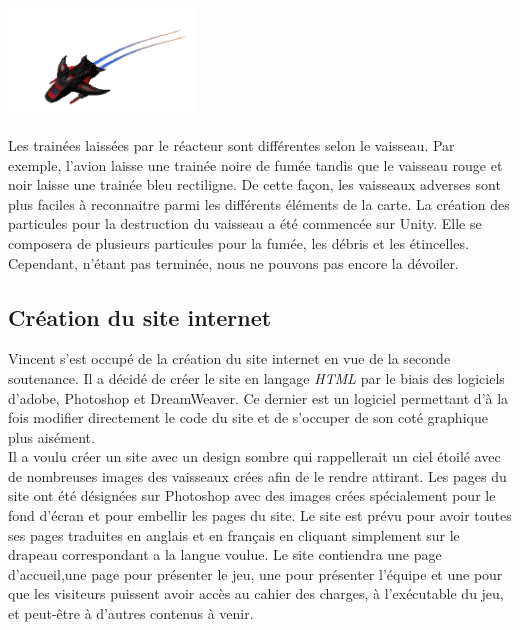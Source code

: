 \documentclass[10pt, titlepage]{report}
\begin{document}
\begin{center}
\includegraphics[height=3cm, width=5cm]{vaisseau_bouge.png}
\end{center}

Les trainées laissées par le réacteur sont différentes selon le vaisseau. Par exemple, l'avion laisse une trainée noire de fumée tandis que le vaisseau rouge et noir laisse une trainée bleu rectiligne. De cette façon, les vaisseaux adverses sont plus faciles à reconnaitre parmi les différents éléments de la carte. La création des particules pour la destruction du vaisseau a été commencée sur Unity. Elle se composera de plusieurs particules pour la fumée, les débris et les étincelles. Cependant, n’étant pas terminée, nous ne pouvons pas encore la dévoiler.  \\

\subsection{Création du site internet}
Vincent s'est occupé de la création du site internet en vue de la seconde soutenance. Il a décidé de créer le site en langage \textit{HTML} par le biais des logiciels d'adobe, Photoshop et DreamWeaver. Ce dernier est un logiciel permettant d'à la fois modifier directement le code du site et de s'occuper de son coté graphique plus aisément.\\

Il a voulu créer un site avec un design sombre qui rappellerait un ciel étoilé avec de nombreuses images des vaisseaux crées afin de le rendre attirant. Les pages du site ont été désignées sur Photoshop avec des images crées spécialement pour le fond d'écran et pour embellir les pages du site. Le site est prévu pour avoir toutes ses pages traduites en anglais et en français en cliquant simplement sur le drapeau correspondant a la langue voulue. Le site contiendra une page d'accueil,une page pour présenter le jeu, une pour présenter l'équipe et une pour que les visiteurs puissent avoir accès au cahier des charges, à l'exécutable du jeu, et peut-être à d'autres contenus à venir.\\
\end{document}
